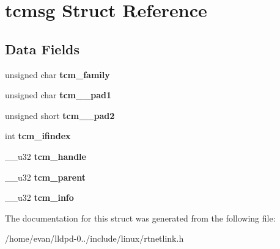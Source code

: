 \section{tcmsg \-Struct \-Reference}
\label{structtcmsg}
\subsection*{\-Data \-Fields}
\begin{DoxyCompactItemize}
\item 
unsigned char {\bfseries tcm\-\_\-family}\label{structtcmsg_a071095731f3b52eedfb662d7697fc4ff}

\item 
unsigned char {\bfseries tcm\-\_\-\-\_\-pad1}\label{structtcmsg_a41c195c0dae5991128b267729919bb7d}

\item 
unsigned short {\bfseries tcm\-\_\-\-\_\-pad2}\label{structtcmsg_a54ac69d77790abb01bac26d50b874663}

\item 
int {\bfseries tcm\-\_\-ifindex}\label{structtcmsg_a5c52d4e5f65d251438977d91bcd8b339}

\item 
\-\_\-\-\_\-u32 {\bfseries tcm\-\_\-handle}\label{structtcmsg_af4102f863280d8ee5e1e8e6ab6cc482b}

\item 
\-\_\-\-\_\-u32 {\bfseries tcm\-\_\-parent}\label{structtcmsg_ab291c748ea0f6fcbe627faf54b425f78}

\item 
\-\_\-\-\_\-u32 {\bfseries tcm\-\_\-info}\label{structtcmsg_aba52ad671d78d7d295cb14e4217fea7e}

\end{DoxyCompactItemize}


\-The documentation for this struct was generated from the following file\-:\begin{DoxyCompactItemize}
\item 
/home/evan/lldpd-\/0../include/linux/rtnetlink.\-h\end{DoxyCompactItemize}

